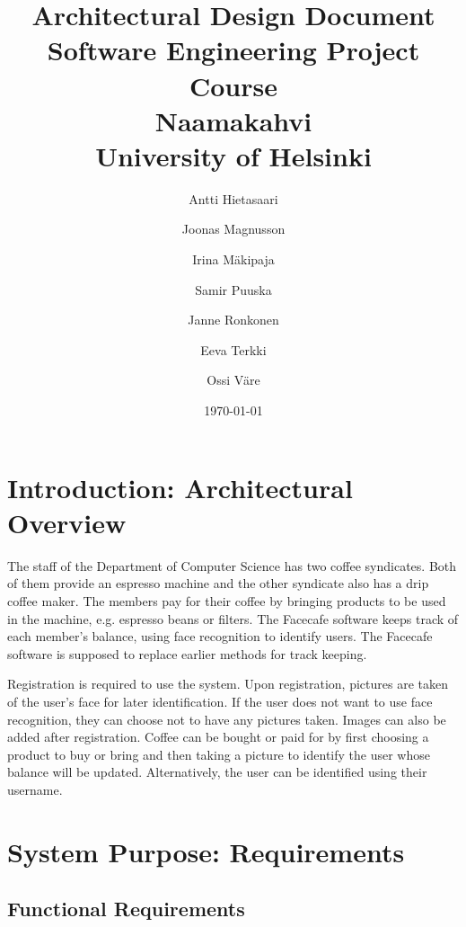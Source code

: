 \documentclass[11pt]{article}
\title{Architectural Design Document\\
  Software Engineering Project Course\\
  Naamakahvi\\
  University of Helsinki}
\author{Antti Hietasaari
  \and Joonas Magnusson
  \and Irina Mäkipaja
  \and Samir Puuska
  \and Janne Ronkonen
  \and Eeva Terkki
  \and Ossi Väre}
\date{\today}
\begin{document}
\maketitle

\tableofcontents



\section{Introduction: Architectural Overview}

The staff of the Department of Computer Science has two coffee syndicates. 
Both of them provide an espresso machine and the other syndicate also has 
a drip coffee maker. The members pay for their coffee by bringing products 
to be used in the machine, e.g. espresso beans or filters. The Facecafe 
software keeps track of each member’s balance, using face recognition to 
identify users. The Facecafe software is supposed to replace earlier 
methods for track keeping.

Registration is required to use the system. Upon registration, pictures are
taken of the user's face for later identification. If the user does not want
to use face recognition, they can choose not to have any pictures taken. 
Images can also be added after registration. Coffee can be bought or paid 
for by first choosing a product to buy or bring and then taking a picture to 
identify the user whose balance will be updated. Alternatively, the user can
be identified using their username. 

\section{System Purpose: Requirements}

\subsection{Functional Requirements}
\end{document}
